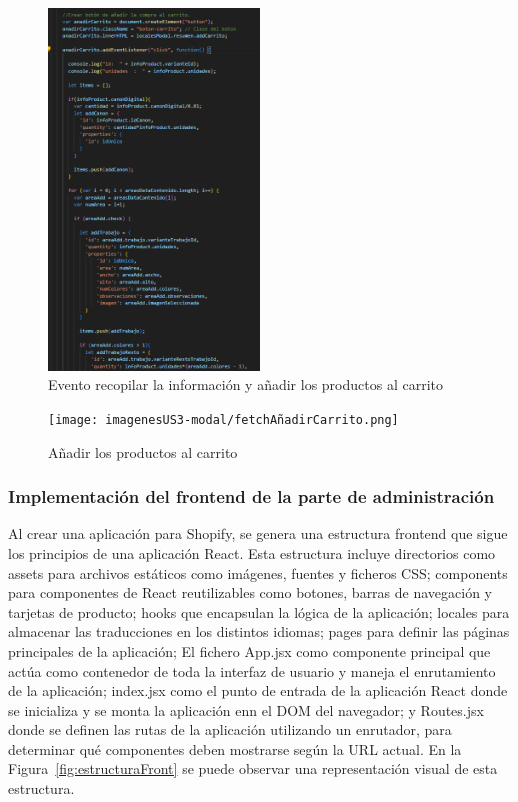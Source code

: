 \documentclass[12pt]{article}
\begin{document}
\begin{figure}[ht]
    \centering
    \includegraphics[width=0.5\textwidth]{imagenesUS3-modal/AnadirCarritoParte1addEventListenerCracionBoton.png}
    \caption{\label{fig:addCarritoEvento} Evento recopilar la información y añadir los productos al carrito}
    \vspace{\fill}
\end{figure}

\begin{figure}[ht]
    \centering
    \texttt{[image: imagenesUS3-modal/fetchAñadirCarrito.png]}
    \caption{\label{fig:addCarritoFuncion} Añadir los productos al carrito}
    \vspace{\fill}
\end{figure}


\clearpage
\subsubsection{Implementación del frontend de la parte de administración}

Al crear una aplicación para Shopify, se genera una estructura frontend que sigue los principios de una aplicación React. Esta estructura incluye directorios como assets para 
archivos estáticos como imágenes, fuentes y ficheros CSS; components para componentes de React reutilizables como botones, barras de navegación y tarjetas de producto; 
hooks que encapsulan la lógica de la aplicación; locales para almacenar las traducciones en los distintos idiomas; pages para definir las páginas principales de la aplicación; El fichero App.jsx como
componente principal que actúa como contenedor de toda la interfaz de usuario y maneja el enrutamiento de la aplicación; index.jsx como el punto de entrada de la aplicación React donde
se inicializa y se monta la aplicación enn el DOM del navegador; y Routes.jsx donde se definen las rutas de la aplicación utilizando un enrutador, para determinar qué componentes
deben mostrarse según la URL actual. En la Figura~\ref{fig:estructuraFront} se puede observar una representación visual de esta estructura.
\end{document}
